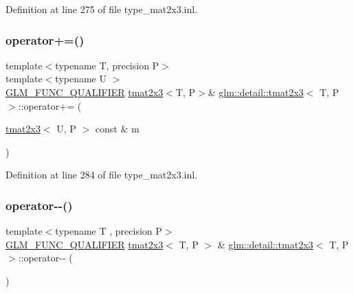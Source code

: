 Definition at line 275 of file type\+\_\+mat2x3.\+inl.

\mbox{\label{structglm_1_1detail_1_1tmat2x3_a5e17d74534e51b89fc4ef088fa42c867}} 
\subsubsection{\texorpdfstring{operator+=()}{operator+=()}\hspace{0.1cm}{\footnotesize\ttfamily [4/4]}}
{\footnotesize\ttfamily template$<$typename T, precision P$>$ \\
template$<$typename U $>$ \\
\hyperlink{setup_8hpp_a33fdea6f91c5f834105f7415e2a64407}{G\+L\+M\+\_\+\+F\+U\+N\+C\+\_\+\+Q\+U\+A\+L\+I\+F\+I\+ER} \hyperlink{structglm_1_1detail_1_1tmat2x3}{tmat2x3}$<$T, P$>$\& \hyperlink{structglm_1_1detail_1_1tmat2x3}{glm\+::detail\+::tmat2x3}$<$ T, P $>$\+::operator+= (\begin{DoxyParamCaption}\item[{\hyperlink{structglm_1_1detail_1_1tmat2x3}{tmat2x3}$<$ U, P $>$ const \&}]{m }\end{DoxyParamCaption})}



Definition at line 284 of file type\+\_\+mat2x3.\+inl.

\mbox{\label{structglm_1_1detail_1_1tmat2x3_a794f237071edb867947ac54de6fa9545}} 
\subsubsection{\texorpdfstring{operator-\/-\/()}{operator--()}\hspace{0.1cm}{\footnotesize\ttfamily [1/2]}}
{\footnotesize\ttfamily template$<$typename T , precision P$>$ \\
\hyperlink{setup_8hpp_a33fdea6f91c5f834105f7415e2a64407}{G\+L\+M\+\_\+\+F\+U\+N\+C\+\_\+\+Q\+U\+A\+L\+I\+F\+I\+ER} \hyperlink{structglm_1_1detail_1_1tmat2x3}{tmat2x3}$<$ T, P $>$ \& \hyperlink{structglm_1_1detail_1_1tmat2x3}{glm\+::detail\+::tmat2x3}$<$ T, P $>$\+::operator-\/-\/ (\begin{DoxyParamCaption}{ }\end{DoxyParamCaption})}



